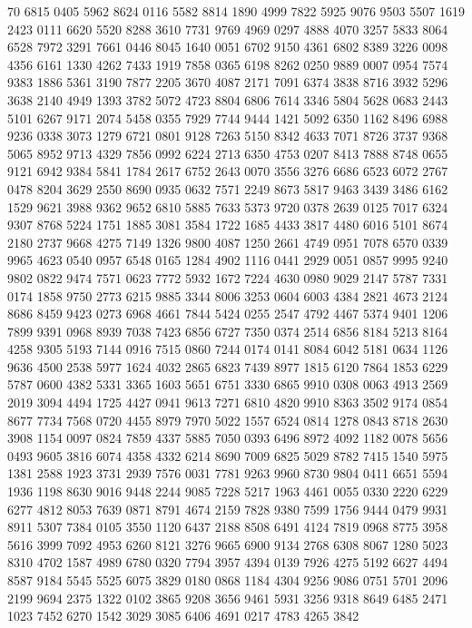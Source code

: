 70 6815 0405
5962 8624 0116 5582 8814
1890 4999 7822 5925 9076
9503 5507 1619 2423 0111
6620 5520 8288 3610 7731
9769 4969 0297 4888 4070
3257 5833 8064 6528 7972
3291 7661 0446 8045 1640
0051 6702 9150 4361 6802
8389 3226 0098 4356 6161
1330 4262 7433 1919 7858
0365 6198 8262 0250 9889
0007 0954 7574 9383 1886
5361 3190 7877 2205 3670
4087 2171 7091 6374 3838
8716 3932 5296 3638 2140
4949 1393 3782 5072 4723
8804 6806 7614 3346 5804
5628 0683 2443 5101 6267
9171 2074 5458 0355 7929
7744 9444 1421 5092 6350
1162 8496 6988 9236 0338
3073 1279 6721 0801 9128
7263 5150 8342 4633 7071
8726 3737 9368 5065 8952
9713 4329 7856 0992 6224
2713 6350 4753 0207 8413
7888 8748 0655 9121 6942
9384 5841 1784 2617 6752
2643 0070 3556 3276 6686
6523 6072 2767 0478 8204
3629 2550 8690 0935 0632
7571 2249 8673 5817 9463
3439 3486 6162 1529 9621
3988 9362 9652 6810 5885
7633 5373 9720 0378 2639
0125 7017 6324 9307 8768
5224 1751 1885 3081 3584
1722 1685 4433 3817 4480
6016 5101 8674 2180 2737
9668 4275 7149 1326 9800
4087 1250 2661 4749 0951
7078 6570 0339 9965 4623
0540 0957 6548 0165 1284
4902 1116 0441 2929 0051
0857 9995 9240 9802 0822
9474 7571 0623 7772 5932
1672 7224 4630 0980 9029
2147 5787 7331 0174 1858
9750 2773 6215 9885 3344
8006 3253 0604 6003 4384
2821 4673 2124 8686 8459
9423 0273 6968 4661 7844
5424 0255 2547 4792 4467
5374 9401 1206 7899 9391
0968 8939 7038 7423 6856
6727 7350 0374 2514 6856
8184 5213 8164 4258 9305
5193 7144 0916 7515 0860
7244 0174 0141 8084 6042
5181 0634 1126 9636 4500
2538 5977 1624 4032 2865
6823 7439 8977 1815 6120
7864 1853 6229 5787 0600
4382 5331 3365 1603 5651
6751 3330 6865 9910 0308
0063 4913 2569 2019 3094
4494 1725 4427 0941 9613
7271 6810 4820 9910 8363
3502 9174 0854 8677 7734
7568 0720 4455 8979 7970
5022 1557 6524 0814 1278
0843 8718 2630 3908 1154
0097 0824 7859 4337 5885
7050 0393 6496 8972 4092
1182 0078 5656 0493 9605
3816 6074 4358 4332 6214
8690 7009 6825 5029 8782
7415 1540 5975 1381 2588
1923 3731 2939 7576 0031
7781 9263 9960 8730 9804
0411 6651 5594 1936 1198
8630 9016 9448 2244 9085
7228 5217 1963 4461 0055
0330 2220 6229 6277 4812
8053 7639 0871 8791 4674
2159 7828 9380 7599 1756
9444 0479 9931 8911 5307
7384 0105 3550 1120 6437
2188 8508 6491 4124 7819
0968 8775 3958 5616 3999
7092 4953 6260 8121 3276
9665 6900 9134 2768 6308
8067 1280 5023 8310 4702
1587 4989 6780 0320 7794
3957 4394 0139 7926 4275
5192 6627 4494 8587 9184
5545 5525 6075 3829 0180
0868 1184 4304 9256 9086
0751 5701 2096 2199 9694
2375 1322 0102 3865 9208
3656 9461 5931 3256 9318
8649 6485 2471 1023 7452
6270 1542 3029 3085 6406
4691 0217 4783 4265 3842
